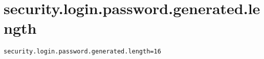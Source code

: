 \section{security.login.password.generated.length}
\label{configuration:SecurityLoginPasswordGeneratedLength}
\AvailableInJavaOnly{\TODO}
\begin{lstlisting}[style=Props,caption={Usage example for \textit{security.login.password.generated.length}}]
security.login.password.generated.length=16
\end{lstlisting}